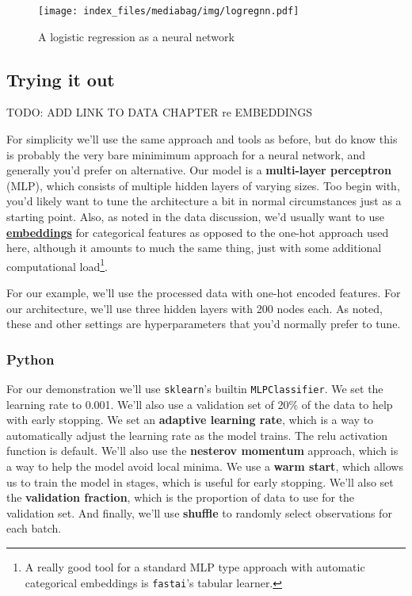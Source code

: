 \documentclass[
  letterpaper,
]{krantz}
\begin{document}
\hypertarget{logistic-nn-graph}{}

\begin{figure}

{\centering \texttt{[image: index\_files/mediabag/img/logregnn.pdf]}

}

\caption{A logistic regression as a neural network}

\end{figure}

\subsection{Trying it out}\label{trying-it-out}

TODO: ADD LINK TO DATA CHAPTER re EMBEDDINGS

For simplicity we'll use the same approach and tools as before, but do
know this is probably the very bare minimimum approach for a neural
network, and generally you'd prefer on alternative. Our model is a
\textbf{multi-layer perceptron} (MLP), which consists of multiple hidden
layers of varying sizes. Too begin with, you'd likely want to tune the
architecture a bit in normal circumstances just as a starting point.
Also, as noted in the data discussion, we'd usually want to use
\hyperref[data-cat]{\textbf{embeddings}} for categorical features as
opposed to the one-hot approach used here, although it amounts to much
the same thing, just with some additional computational load\footnote{A
  really good tool for a standard MLP type approach with automatic
  categorical embeddings is \texttt{fastai}'s tabular learner.}.

For our example, we'll use the processed data with one-hot encoded
features. For our architecture, we'll use three hidden layers with 200
nodes each. As noted, these and other settings are hyperparameters that
you'd normally prefer to tune.

\subsubsection{Python}

For our demonstration we'll use \texttt{sklearn}'s builtin
\texttt{MLPClassifier}. We set the learning rate to 0.001. We'll also
use a validation set of 20\% of the data to help with early stopping. We
set an \textbf{adaptive learning rate}, which is a way to automatically
adjust the learning rate as the model trains. The relu activation
function is default. We'll also use the \textbf{nesterov momentum}
approach, which is a way to help the model avoid local minima. We use a
\textbf{warm start}, which allows us to train the model in stages, which
is useful for early stopping. We'll also set the \textbf{validation
fraction}, which is the proportion of data to use for the validation
set. And finally, we'll use \textbf{shuffle} to randomly select
observations for each batch.
\end{document}
